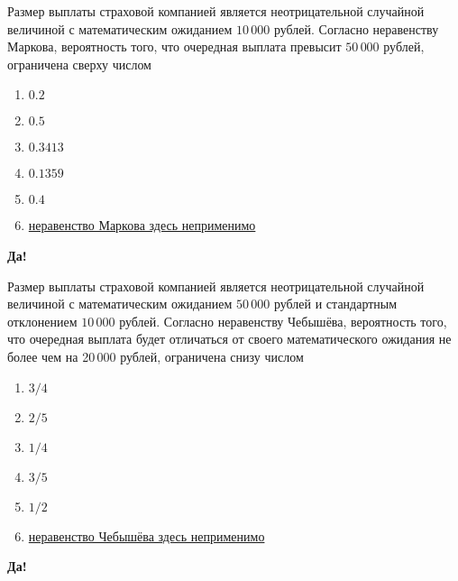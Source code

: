 \documentclass[t]{beamer}
\begin{document}
 \begin{frame} \label{19-Yes} 
\begin{block}{19} 

Размер выплаты страховой компанией является неотрицательной случайной величиной с математическим ожиданием $10\,000$ рублей. Согласно неравенству Маркова, вероятность того, что очередная выплата превысит $50\,000$ рублей, ограничена сверху числом
  


 \end{block} 
\begin{enumerate} 
\item[] \hyperlink{19-Yes}{\beamergotobutton{} $0.2$}
\item[] \hyperlink{19-No}{\beamergotobutton{} $0.5$}
\item[] \hyperlink{19-No}{\beamergotobutton{} $0.3413$}
\item[] \hyperlink{19-No}{\beamergotobutton{} $0.1359$}
\item[] \hyperlink{19-No}{\beamergotobutton{} $0.4$}
\item[] \hyperlink{19-No}{\beamergotobutton{} неравенство Маркова здесь неприменимо}
\end{enumerate} 

 \textbf{Да!} 
 \hyperlink{20}{}\end{frame} 


 \begin{frame} \label{20-Yes} 
\begin{block}{20} 

  Размер выплаты страховой компанией является неотрицательной случайной величиной с математическим ожиданием $50\,000$ рублей и стандартным отклонением $10\,000$ рублей. Согласно неравенству Чебышёва, вероятность того, что очередная выплата будет отличаться от своего математического ожидания не более чем на 20\,000 рублей, ограничена снизу числом
  


 \end{block} 
\begin{enumerate} 
\item[] \hyperlink{20-Yes}{\beamergotobutton{} $3/4$}
\item[] \hyperlink{20-No}{\beamergotobutton{} $2/5$}
\item[] \hyperlink{20-No}{\beamergotobutton{} $1/4$}
\item[] \hyperlink{20-No}{\beamergotobutton{} $3/5$}
\item[] \hyperlink{20-No}{\beamergotobutton{} $1/2$}
\item[] \hyperlink{20-No}{\beamergotobutton{} неравенство Чебышёва здесь неприменимо}
\end{enumerate} 

 \textbf{Да!} 
 \hyperlink{21}{}\end{frame} 
\end{document}
